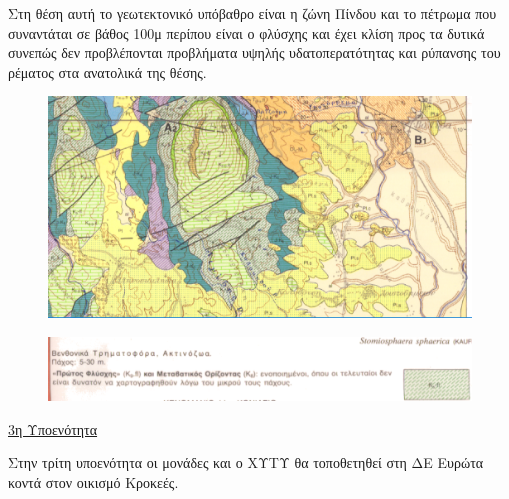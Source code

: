 \documentclass[12pt]{article}
\begin{document}
	Στη θέση αυτή το γεωτεκτονικό υπόβαθρο είναι η ζώνη Πίνδου και το πέτρωμα που συναντάται σε βάθος 100μ περίπου είναι ο φλύσχης και έχει κλίση προς τα δυτικά συνεπώς δεν προβλέπονται προβλήματα υψηλής υδατοπερατότητας και ρύπανσης του ρέματος στα ανατολικά της θέσης.
	
	\begin{figure} [H]
		\begin{center}
			\includegraphics [scale = 0.22] {map22.png}
		\end{center}
	\end{figure}

	\begin{figure} [H]
		\begin{center}
			\includegraphics [scale = 0.40] {explain2.png}
		\end{center}
	\end{figure}

	\underline{3η Υποενότητα}
	
	Στην τρίτη υποενότητα οι μονάδες και ο ΧΥΤΥ θα τοποθετηθεί στη ΔΕ Ευρώτα κοντά στον οικισμό Κροκεές. 
	
\end{document}
